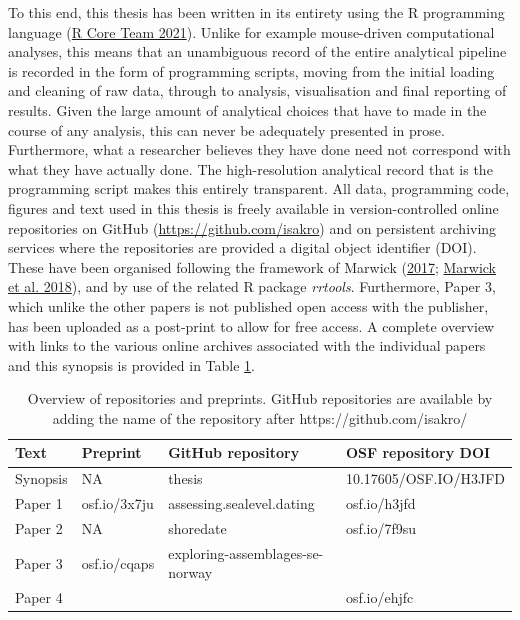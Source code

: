 \documentclass[
  12pt,
  a4paper,
  oneside]{book}
\begin{document}
To this end, this thesis has been written in its entirety using the R programming language (\protect\hyperlink{ref-rcoreteam2021}{R Core Team 2021}). Unlike for example mouse-driven computational analyses, this means that an unambiguous record of the entire analytical pipeline is recorded in the form of programming scripts, moving from the initial loading and cleaning of raw data, through to analysis, visualisation and final reporting of results. Given the large amount of analytical choices that have to made in the course of any analysis, this can never be adequately presented in prose. Furthermore, what a researcher believes they have done need not correspond with what they have actually done. The high-resolution analytical record that is the programming script makes this entirely transparent. All data, programming code, figures and text used in this thesis is freely available in version-controlled online repositories on GitHub (\url{https://github.com/isakro}) and on persistent archiving services where the repositories are provided a digital object identifier (DOI). These have been organised following the framework of Marwick (\protect\hyperlink{ref-marwick2017}{2017}; \protect\hyperlink{ref-marwick2018}{Marwick et al. 2018}), and by use of the related R package \emph{rrtools}. Furthermore, Paper 3, which unlike the other papers is not published open access with the publisher, has been uploaded as a post-print to allow for free access. A complete overview with links to the various online archives associated with the individual papers and this synopsis is provided in Table \ref{tab:op}.

\begin{table}

\caption{\label{tab:op}Overview of repositories and preprints. GitHub repositories are available by adding the name of the repository after https://github.com/isakro/}
\centering
\begin{tabular}[t]{llll}
\toprule
Text & Preprint & GitHub repository & OSF repository DOI\\
\midrule
Synopsis & NA & thesis & 10.17605/OSF.IO/H3JFD\\
Paper 1 & osf.io/3x7ju & assessing.sealevel.dating & osf.io/h3jfd\\
Paper 2 & NA & shoredate & osf.io/7f9su\\
Paper 3 & osf.io/cqaps & exploring-assemblages-se-norway & \\
Paper 4 &  &  & osf.io/ehjfc\\
\bottomrule
\end{tabular}
\end{table}
\end{document}
